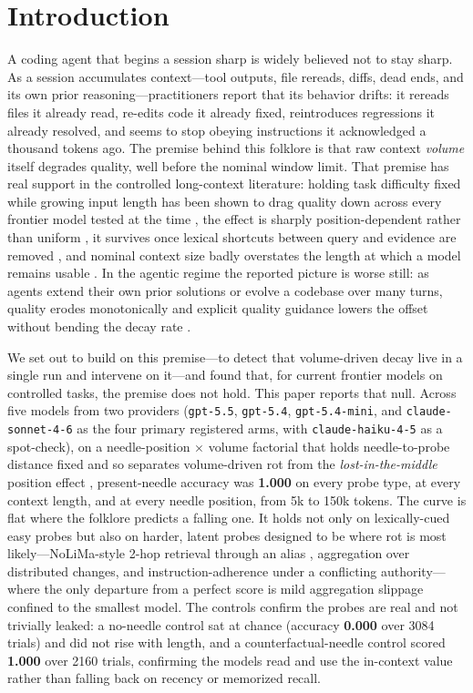 \documentclass[11pt]{article}
\begin{document}
\section{Introduction}
\label{sec:intro}

A coding agent that begins a session sharp is widely believed not to stay sharp. As a session accumulates context---tool outputs, file rereads, diffs, dead ends, and its own prior reasoning---practitioners report that its behavior drifts: it rereads files it already read, re-edits code it already fixed, reintroduces regressions it already resolved, and seems to stop obeying instructions it acknowledged a thousand tokens ago. The premise behind this folklore is that raw context \emph{volume} itself degrades quality, well before the nominal window limit. That premise has real support in the controlled long-context literature: holding task difficulty fixed while growing input length has been shown to drag quality down across every frontier model tested at the time \cite{hong2025contextrot}, the effect is sharply position-dependent rather than uniform \cite{liu2024lostmiddle}, it survives once lexical shortcuts between query and evidence are removed \cite{modarressi2025nolima}, and nominal context size badly overstates the length at which a model remains usable \cite{hsieh2024ruler}. In the agentic regime the reported picture is worse still: as agents extend their own prior solutions or evolve a codebase over many turns, quality erodes monotonically and explicit quality guidance lowers the offset without bending the decay rate \cite{orlanski2026slopcodebench, deng2026evoclaw}.

We set out to build on this premise---to detect that volume-driven decay live in a single run and intervene on it---and found that, for current frontier models on controlled tasks, the premise does not hold. This paper reports that null. Across five models from two providers (\texttt{gpt-5.5}, \texttt{gpt-5.4}, \texttt{gpt-5.4-mini}, and \texttt{claude-sonnet-4-6} as the four primary registered arms, with \texttt{claude-haiku-4-5} as a spot-check), on a needle-position $\times$ volume factorial that holds needle-to-probe distance fixed and so separates volume-driven rot from the \emph{lost-in-the-middle} position effect \cite{liu2024lostmiddle}, present-needle accuracy was \textbf{1.000} on every probe type, at every context length, and at every needle position, from 5k to 150k tokens. The curve is flat where the folklore predicts a falling one. It holds not only on lexically-cued easy probes but also on harder, latent probes designed to be where rot is most likely---NoLiMa-style 2-hop retrieval through an alias \cite{modarressi2025nolima}, aggregation over distributed changes, and instruction-adherence under a conflicting authority---where the only departure from a perfect score is mild aggregation slippage confined to the smallest model. The controls confirm the probes are real and not trivially leaked: a no-needle control sat at chance (accuracy \textbf{0.000} over 3084 trials) and did not rise with length, and a counterfactual-needle control scored \textbf{1.000} over 2160 trials, confirming the models read and use the in-context value rather than falling back on recency or memorized recall.
\end{document}
